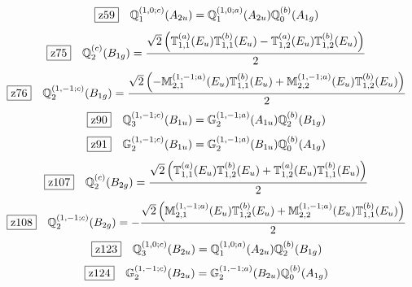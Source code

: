 \documentclass[fleqn,10pt,landscape]{jsarticle}
\begin{document}
\begin{dmath*}
\hspace*{3mm}\fbox{z59}\quad \mathbb{Q}_{1}^{(1,0;c)}(A_{2u})=\mathbb{Q}_{1}^{(1,0;a)}(A_{2u}) \mathbb{Q}_{0}^{(b)}(A_{1g})
\end{dmath*}
\begin{dmath*}
\hspace*{3mm}\fbox{z75}\quad \mathbb{Q}_{2}^{(c)}(B_{1g})=\frac{\sqrt{2} \left(\mathbb{T}_{1,1}^{(a)}(E_{u}) \mathbb{T}_{1,1}^{(b)}(E_{u}) - \mathbb{T}_{1,2}^{(a)}(E_{u}) \mathbb{T}_{1,2}^{(b)}(E_{u})\right)}{2}
\end{dmath*}
\begin{dmath*}
\hspace*{3mm}\fbox{z76}\quad \mathbb{Q}_{2}^{(1,-1;c)}(B_{1g})=\frac{\sqrt{2} \left(- \mathbb{M}_{2,1}^{(1,-1;a)}(E_{u}) \mathbb{T}_{1,1}^{(b)}(E_{u}) + \mathbb{M}_{2,2}^{(1,-1;a)}(E_{u}) \mathbb{T}_{1,2}^{(b)}(E_{u})\right)}{2}
\end{dmath*}
\begin{dmath*}
\hspace*{3mm}\fbox{z90}\quad \mathbb{Q}_{3}^{(1,-1;c)}(B_{1u})=\mathbb{G}_{2}^{(1,-1;a)}(A_{1u}) \mathbb{Q}_{2}^{(b)}(B_{1g})
\end{dmath*}
\begin{dmath*}
\hspace*{3mm}\fbox{z91}\quad \mathbb{G}_{2}^{(1,-1;c)}(B_{1u})=\mathbb{G}_{2}^{(1,-1;a)}(B_{1u}) \mathbb{Q}_{0}^{(b)}(A_{1g})
\end{dmath*}
\begin{dmath*}
\hspace*{3mm}\fbox{z107}\quad \mathbb{Q}_{2}^{(c)}(B_{2g})=\frac{\sqrt{2} \left(\mathbb{T}_{1,1}^{(a)}(E_{u}) \mathbb{T}_{1,2}^{(b)}(E_{u}) + \mathbb{T}_{1,2}^{(a)}(E_{u}) \mathbb{T}_{1,1}^{(b)}(E_{u})\right)}{2}
\end{dmath*}
\begin{dmath*}
\hspace*{3mm}\fbox{z108}\quad \mathbb{Q}_{2}^{(1,-1;c)}(B_{2g})=- \frac{\sqrt{2} \left(\mathbb{M}_{2,1}^{(1,-1;a)}(E_{u}) \mathbb{T}_{1,2}^{(b)}(E_{u}) + \mathbb{M}_{2,2}^{(1,-1;a)}(E_{u}) \mathbb{T}_{1,1}^{(b)}(E_{u})\right)}{2}
\end{dmath*}
\begin{dmath*}
\hspace*{3mm}\fbox{z123}\quad \mathbb{Q}_{3}^{(1,0;c)}(B_{2u})=\mathbb{Q}_{1}^{(1,0;a)}(A_{2u}) \mathbb{Q}_{2}^{(b)}(B_{1g})
\end{dmath*}
\begin{dmath*}
\hspace*{3mm}\fbox{z124}\quad \mathbb{G}_{2}^{(1,-1;c)}(B_{2u})=\mathbb{G}_{2}^{(1,-1;a)}(B_{2u}) \mathbb{Q}_{0}^{(b)}(A_{1g})
\end{dmath*}
\end{document}
